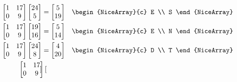 \begin{examplebox}{}{}
$$\begin{aligned}
\begin{bmatrix}
            1 & 17 \\
            0 & 9
        \end{bmatrix} \begin{bmatrix}
            24 \\
            5
        \end{bmatrix} & = \begin{bmatrix}
            5 \\
            19
        \end{bmatrix} & & \begin{NiceArray}{c}
            E \\
            S
        \end{NiceArray} \\
        \begin{bmatrix}
            1 & 17 \\
            0 & 9
        \end{bmatrix} \begin{bmatrix}
            19 \\
            16
        \end{bmatrix} & = \begin{bmatrix}
            5 \\
            14
        \end{bmatrix} & & \begin{NiceArray}{c}
            E \\
            N
        \end{NiceArray} \\
        \begin{bmatrix}
            1 & 17 \\
            0 & 9
        \end{bmatrix} \begin{bmatrix}
            24 \\
            8
        \end{bmatrix} & = \begin{bmatrix}
            4 \\
            20
        \end{bmatrix} & & \begin{NiceArray}{c}
            D \\
            T
        \end{NiceArray} \\
        \begin{bmatrix}
            1 & 17 \\
            0 & 9
        \end{bmatrix} \begin{bmatrix}

\end{bmatrix}
\end{aligned}$$
\end{examplebox}

